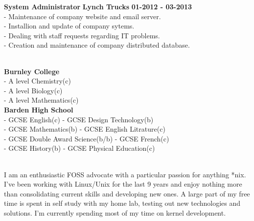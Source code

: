 \documentclass[12pt,a4paper]{article}
\begin{document}
\textbf{System Administrator}
\hspace*{1.7cm}\textbf{Lynch Trucks}
\hspace*{1.7cm}\textbf{01-2012 - 03-2013}\\
\hspace*{.5cm} - Maintenance of company website and email server.\\
\hspace*{.5cm} - Installion and update of company sytems.\\
\hspace*{.5cm} - Dealing with staff requests regarding IT problems.\\
\hspace*{.5cm} - Creation and maintenance of company distributed database.\\
\hspace*{.5cm}

\raggedright{}\\
\textbf{Burnley College}\\
\hspace*{.5cm} - A level Chemistry(c)\\ 
\hspace*{.5cm} - A level Biology(c)\\
\hspace*{.5cm} - A level Mathematics(c)\\
\textbf{Barden High School}\\
\hspace*{.5cm} - GCSE English(c) \hspace*{3.2cm} - GCSE Design Technology(b)\\
\hspace*{.5cm} - GCSE Mathematics(b) \hspace*{2.1cm} - GCSE English Litrature(c)\\
\hspace*{.5cm} - GCSE Double Award Science(b/b) \hspace*{0cm} - GCSE French(c)\\
\hspace*{.5cm} - GCSE History(b) \hspace*{3.1cm} - GCSE Physical Education(c)\\
\hspace*{.5cm}

\raggedright{}\\
I am an enthusiastic FOSS advocate with a particular passion for anything *nix. I’ve been working with Linux/Unix for the last 9 years and enjoy nothing more than consolidating current skills and developing new ones. A large part of my free time is spent in self study with my home lab, testing out new technologies and solutions. I'm currently spending most of my time on kernel development.
\end{document}
